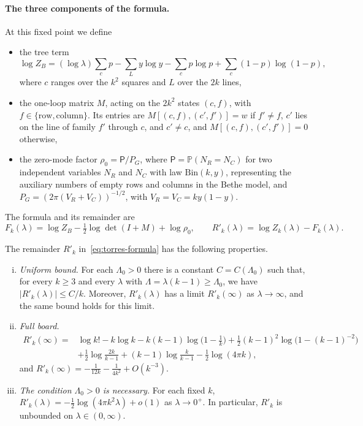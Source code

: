 \paragraph{The three components of the formula.}
At this fixed point we define
\begin{itemize}
\item the tree term
 \[
  \log Z_B=(\log\lambda)\sum_cp-\sum_Ly\log y-\sum_cp\log p+\sum_c(1-p)\log(1-p),
 \]
 where $c$ ranges over the $k^2$ squares and $L$ over the $2k$ lines,
\item the one-loop matrix $M$, acting on the $2k^2$ states $(c,f)$, with
 $f\in\{\text{row},\text{column}\}$. Its entries are $M[(c,f),(c',f')]=w$ if $f'\ne f$, $c'$ lies on the
line of
 family $f'$ through $c$, and $c'\ne c$, and $M[(c,f),(c',f')]=0$ otherwise,
\item the zero-mode factor $\rho_0=\mathsf P/P_G$, where $\mathsf P=\mathbb P(N_R=N_C)$ for two
 independent variables $N_R$ and $N_C$ with law $\mathrm{Bin}(k,y)$, representing the auxiliary numbers of
empty rows and
 columns in the Bethe model, and $P_G=(2\pi(V_R+V_C))^{-1/2}$, with $V_R=V_C=ky(1-y)$.
\end{itemize}
The formula and its remainder are
\begin{equation}\label{eq:torres-formula}
 F_k(\lambda)=\log Z_B-\tfrac12\log\det(I+M)+\log\rho_0,\qquad R'_k(\lambda)=\log Z_k(\lambda)-F_k(\lambda).
\end{equation}

\begin{teorema}\label{thm:torres}
The remainder $R'_k$ in~\eqref{eq:torres-formula} has the following properties.
\begin{enumerate}[(i)]
\item \emph{Uniform bound.} For each $\Lambda_0>0$ there is a constant $C=C(\Lambda_0)$ such that, for
 every $k\ge3$ and every $\lambda$ with $\Lambda=\lambda(k-1)\ge\Lambda_0$, we have $|R'_k(\lambda)|\le
C/k$.
 Moreover, $R'_k(\lambda)$ has a limit $R'_k(\infty)$ as $\lambda\to\infty$, and the same bound holds
 for this limit.
\item \emph{Full board.}
 \[
 \begin{aligned}
  R'_k(\infty)={}&\log k!-k\log k-k(k-1)\log\bigl(1-\tfrac1k\bigr)
  +\tfrac12(k-1)^2\log\bigl(1-(k-1)^{-2}\bigr)\\
  &+\tfrac12\log\frac{2k}{k-1}+(k-1)\log\frac k{k-1}-\tfrac12\log(4\pi k),
 \end{aligned}
 \]
 and $R'_k(\infty)=-\frac1{12k}-\frac1{4k^2}+O(k^{-3})$.
\item \emph{The condition $\Lambda_0>0$ is necessary.} For each fixed $k$, $R'_k(\lambda)=-\frac12\log(4\pi
k^2\lambda)+o(1)$
 as $\lambda\to0^+$. In particular, $R'_k$ is unbounded on $\lambda\in(0,\infty)$.
\end{enumerate}
\end{teorema}

